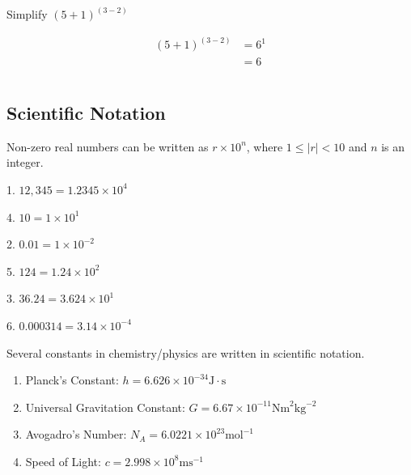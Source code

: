 \documentclass[crop=false,class=article,oneside]{standalone}
\begin{document}
            \hfill
            \begin{minipage}[t]{0.49\textwidth}
                \begin{problem}
                    Simplify $(5+1)^{(3-2)}$
                \end{problem}
                \begin{framesolution}
                    \begin{align*}
                        (5+1)^{(3-2)}&=6^{1}\\
                        &=\boxed{6}\\
                        &\\
                        &
                    \end{align*}
                \end{framesolution}
            \end{minipage}
    \subsection{Scientific Notation}
        Non-zero real numbers can be written as
        ${r}\times{10^{n}}$, where ${1}\leq{|r|}<10$
        and $n$ is an integer.
        \begin{frameexample}{}{}
            \begin{enumerate}
                \begin{multicols}{3}
                    \item[1.] $12,\!345={1.2345}\times{10^{4}}$
                    \item[4.] $10={1}\times{10^{1}}$
                    \item[2.] $0.01={1}\times{10^{-2}}$
                    \item[5.] $124={1.24}\times{10^{2}}$
                    \item[3.] $36.24={3.624}\times{10^{1}}$
                    \item[6.] $0.000314={3.14}\times{10^{-4}}$
                \end{multicols}
            \end{enumerate}
            Several constants in chemistry/physics are
            written in scientific notation.
            \begin{enumerate}
                \item Planck's Constant:
                    $h={6.626}\times{10^{-34}}%
                    \textrm{J}\cdot\textrm{s}$
                \item Universal Gravitation Constant:
                    $G={6.67}\times{10^{-11}}%
                    \textrm{Nm}^{2}\textrm{kg}^{-2}$
                \item Avogadro's Number:
                    $N_{A}={6.0221}\times{10^{23}}%
                    \textrm{mol}^{-1}$
                \item Speed of Light:
                    $c={2.998}\times{10^{8}\textrm{ms}^{-1}}$
            \end{enumerate}
        \end{frameexample}
\end{document}
